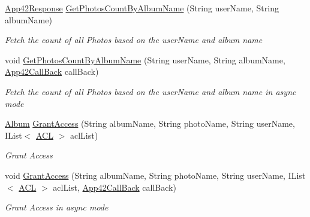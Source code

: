 \begin{DoxyCompactItemize}
\hyperlink{classcom_1_1shephertz_1_1app42_1_1paas_1_1sdk_1_1csharp_1_1_app42_response}{App42\+Response} \hyperlink{classcom_1_1shephertz_1_1app42_1_1paas_1_1sdk_1_1csharp_1_1gallery_1_1_photo_service_a1b98446d40cc0da6c07bb7a5ac0bc047}{Get\+Photos\+Count\+By\+Album\+Name} (String user\+Name, String album\+Name)
\begin{DoxyCompactList}\small\item\em Fetch the count of all Photos based on the user\+Name and album name \end{DoxyCompactList}\item 
void \hyperlink{classcom_1_1shephertz_1_1app42_1_1paas_1_1sdk_1_1csharp_1_1gallery_1_1_photo_service_afa70716da11f42f868d890593493cac5}{Get\+Photos\+Count\+By\+Album\+Name} (String user\+Name, String album\+Name, \hyperlink{interfacecom_1_1shephertz_1_1app42_1_1paas_1_1sdk_1_1csharp_1_1_app42_call_back}{App42\+Call\+Back} call\+Back)
\begin{DoxyCompactList}\small\item\em Fetch the count of all Photos based on the user\+Name and album name in async mode \end{DoxyCompactList}\item 
\hyperlink{classcom_1_1shephertz_1_1app42_1_1paas_1_1sdk_1_1csharp_1_1gallery_1_1_album}{Album} \hyperlink{classcom_1_1shephertz_1_1app42_1_1paas_1_1sdk_1_1csharp_1_1gallery_1_1_photo_service_af406089cad3da3a4d0abf2a9f8c72ec8}{Grant\+Access} (String album\+Name, String photo\+Name, String user\+Name, I\+List$<$ \hyperlink{classcom_1_1shephertz_1_1app42_1_1paas_1_1sdk_1_1csharp_1_1_a_c_l}{A\+C\+L} $>$ acl\+List)
\begin{DoxyCompactList}\small\item\em Grant Access \end{DoxyCompactList}\item 
void \hyperlink{classcom_1_1shephertz_1_1app42_1_1paas_1_1sdk_1_1csharp_1_1gallery_1_1_photo_service_a582098a80e56e765709a25b85e9ecd1a}{Grant\+Access} (String album\+Name, String photo\+Name, String user\+Name, I\+List$<$ \hyperlink{classcom_1_1shephertz_1_1app42_1_1paas_1_1sdk_1_1csharp_1_1_a_c_l}{A\+C\+L} $>$ acl\+List, \hyperlink{interfacecom_1_1shephertz_1_1app42_1_1paas_1_1sdk_1_1csharp_1_1_app42_call_back}{App42\+Call\+Back} call\+Back)
\begin{DoxyCompactList}\small\item\em Grant Access in async mode \end{DoxyCompactList}\item 

\end{DoxyCompactItemize}
